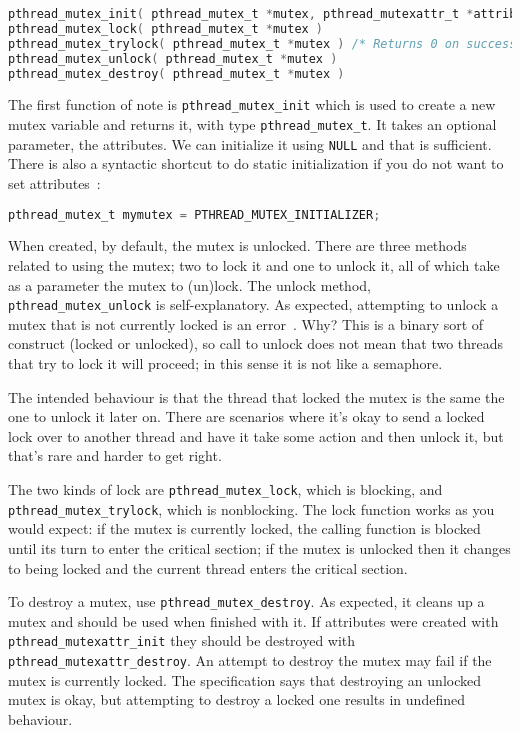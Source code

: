 \begin{lstlisting}[language=C]
pthread_mutex_init( pthread_mutex_t *mutex, pthread_mutexattr_t *attributes )
pthread_mutex_lock( pthread_mutex_t *mutex )
pthread_mutex_trylock( pthread_mutex_t *mutex ) /* Returns 0 on success */
pthread_mutex_unlock( pthread_mutex_t *mutex )
pthread_mutex_destroy( pthread_mutex_t *mutex )
\end{lstlisting}

The first function of note is \texttt{pthread\_mutex\_init} which is used to create a new mutex variable and returns it, with type \texttt{pthread\_mutex\_t}. It takes an optional parameter, the attributes. We can initialize it using \texttt{NULL} and that is sufficient. There is also a syntactic shortcut to do static initialization if you do not want to set attributes~\cite{pthreads}:

\begin{lstlisting}[language=C]
pthread_mutex_t mymutex = PTHREAD_MUTEX_INITIALIZER;
\end{lstlisting}

When created, by default, the mutex is unlocked. There are three methods related to using the mutex; two to lock it and one to unlock it, all of which take as a parameter the mutex to (un)lock. The unlock method, \texttt{pthread\_mutex\_unlock} is self-explanatory. As expected, attempting to unlock a mutex that is not currently locked is an error~\cite{pthreads}. Why? This is a binary sort of construct (locked or unlocked), so call to unlock does not mean that two threads that try to lock it will proceed; in this sense it is not like a semaphore.

The intended behaviour is that the thread that locked the mutex is the same the one to unlock it later on. There are scenarios where it's okay to send a locked lock over to another thread and have it take some action and then unlock it, but that's rare and harder to get right. 

The two kinds of lock are \texttt{pthread\_mutex\_lock}, which is blocking, and \texttt{pthread\_mutex\_trylock}, which is nonblocking. The lock function works as you would expect: if the mutex is currently locked, the calling function is blocked until its turn to enter the critical section; if the mutex is unlocked then it changes to being locked and the current thread enters the critical section.

To destroy a mutex, use \texttt{pthread\_mutex\_destroy}. As expected, it cleans up a mutex and should be used when finished with it. If attributes were created with \texttt{pthread\_mutexattr\_init} they should be destroyed with \texttt{pthread\_mutexattr\_destroy}. An attempt to destroy the mutex may fail if the mutex is currently locked. The specification says that destroying an unlocked mutex is okay, but attempting to destroy a locked one results in undefined behaviour.





